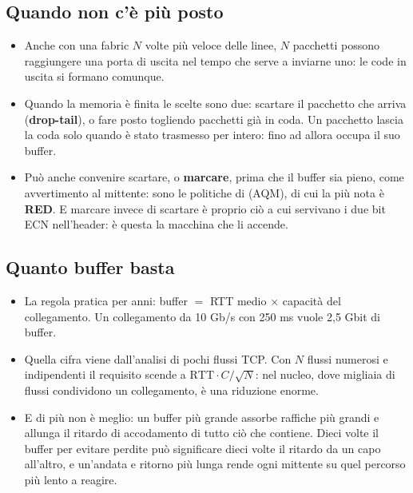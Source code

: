 \subsection{Quando non c'è più posto}

\begin{itemize}
    \item Anche con una fabric $N$ volte più veloce delle linee, $N$ pacchetti possono raggiungere una porta di uscita nel
          tempo che serve a inviarne uno: le code in uscita si formano comunque.
    \item Quando la memoria è finita le scelte sono due: scartare il pacchetto che arriva (\textbf{drop-tail}), o fare
          posto togliendo pacchetti già in coda. Un pacchetto lascia la coda solo quando è stato trasmesso per intero: fino ad
          allora occupa il suo buffer.
    \item Può anche convenire scartare, o \textbf{marcare}, prima che il buffer sia pieno, come avvertimento al mittente: sono
          le politiche di  (AQM), di cui la più nota è \textbf{RED}. E marcare invece di
          scartare è proprio ciò a cui servivano i due bit ECN nell'header: è questa la macchina che li accende.
\end{itemize}

\subsection{Quanto buffer basta}

\begin{itemize}
    \item La regola pratica per anni: buffer $=$ RTT medio $\times$ capacità del collegamento. Un collegamento da 10 Gb/s con
          250 ms vuole 2,5 Gbit di buffer.
    \item Quella cifra viene dall'analisi di pochi flussi TCP. Con $N$ flussi numerosi e indipendenti il requisito scende a
          $\text{RTT} \cdot C / \sqrt{N}$: nel nucleo, dove migliaia di flussi condividono un collegamento, è una riduzione
          enorme.
    \item E di più non è meglio: un buffer più grande assorbe raffiche più grandi e allunga il ritardo di accodamento di tutto
          ciò che contiene. Dieci volte il buffer per evitare perdite può significare dieci volte il ritardo da un capo
          all'altro, e un'andata e ritorno più lunga rende ogni mittente su quel percorso più lento a reagire.
\end{itemize}

